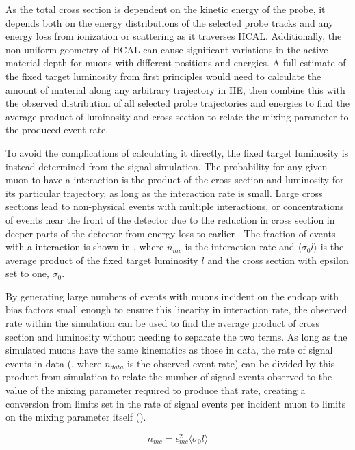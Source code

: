 As the total cross section is dependent on the kinetic energy of the probe, it depends both on the energy distributions of the selected probe tracks and any energy loss from ionization or scattering as it traverses HCAL.
Additionally, the non-uniform geometry of HCAL can cause significant variations in the active material depth for muons with different positions and energies. 
A full estimate of the fixed target luminosity from first principles would need to calculate the amount of material along any arbitrary trajectory in HE, then combine this with the observed distribution of all selected probe trajectories and energies to find the average product of luminosity and cross section to relate the mixing parameter to the produced event rate.

To avoid the complications of calculating it directly, the fixed target luminosity is instead determined from the signal simulation.
The probability for any given muon to have a \dbrem interaction is the product of the cross section and luminosity for its particular trajectory, as long as the interaction rate is small.
Large cross sections lead to non-physical events with multiple \dbrem interactions, or concentrations of \dbrem events near the front of the detector due to the reduction in cross section in deeper parts of the detector from energy loss to earlier \dbrem. 
The fraction of events with a \dbrem interaction is shown in , where $n_{mc}$ is the interaction rate and $\langle \sigma_0 l \rangle$ is the average product of the fixed target luminosity $l$ and the cross section with epsilon set to one, $\sigma_0$.  

By generating large numbers of events with muons incident on the endcap with bias factors small enough to ensure this linearity in interaction rate, the observed rate within the simulation can be used to find the average product of cross section and luminosity without needing to separate the two terms.
As long as the simulated muons have the same kinematics as those in data, the rate of signal events in data (, where $n_{data}$ is the observed event rate) can be divided by this product from simulation to relate the number of signal events observed to the value of the mixing parameter required to produce that rate, creating a conversion from limits set in the rate of signal events per incident muon to limits on the mixing parameter itself ().

\begin{equation}
	\label{eq:mcrate}
	n_{mc} = \epsilon_{mc}^2 \langle \sigma_0 l \rangle
\end{equation}

